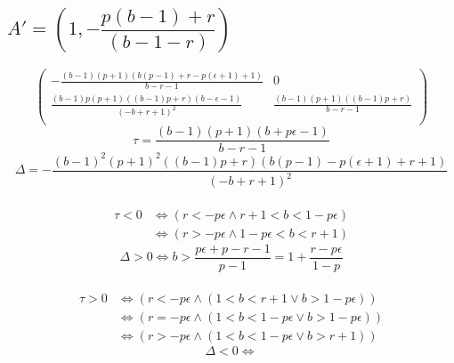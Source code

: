 \documentclass[11pt]{article}
\begin{document}
\subsection*{$A'=\left(1,-\dfrac{ p(b-1)+r}{(b-1-r)}\right)$}
\begin{equation}
\left(
\begin{array}{cc}
 -\frac{(b-1) (p+1) (b (p-1)+r-p (\epsilon +1)+1)}{b-r-1} & 0 \\
 \frac{(b-1) p (p+1) ((b-1) p+r) (b-\epsilon -1)}{(-b+r+1)^2} & \frac{(b-1) (p+1) ((b-1) p+r)}{b-r-1} \\
\end{array}
\right)
\end{equation}
\begin{equation}
\tau=\frac{(b-1) (p+1) (b+p \epsilon -1)}{b-r-1}
\end{equation}
\begin{equation}
\Delta=-\frac{(b-1)^2 (p+1)^2 ((b-1) p+r) (b (p-1)-p (\epsilon +1)+r+1)}{(-b+r+1)^2}
\end{equation}\\

\begin{equation}
\begin{split}
\tau<0 & \Longleftrightarrow \left(r<-p\epsilon \land r+1<b<1-p \epsilon \right)\\
&\Longleftrightarrow \left(r>-p\epsilon \land 1-p \epsilon <b<r+1\right)
\end{split}
\end{equation}
\begin{equation}
\Delta>0\Longleftrightarrow b>\frac{p \epsilon +p-r-1}{p-1}=1+\dfrac{r-p\epsilon}{1-p}
\end{equation}\\

\begin{equation}
\begin{split}
\tau>0 & \Longleftrightarrow \left(r<-p\epsilon\land (1<b<r+1\lor b>1-p \epsilon )\right)\\
&\Longleftrightarrow \left(r=-p\epsilon\land (1<b<1-p \epsilon \lor b>1-p \epsilon )\right)\\
&\Longleftrightarrow \left(r>-p\epsilon\land (1<b<1-p \epsilon \lor b>r+1)\right)
\end{split}
\end{equation}
\begin{equation}
\Delta<0\Longleftrightarrow
\end{equation}
\end{document}
